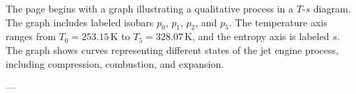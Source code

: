 The page begins with a graph illustrating a qualitative process in a \( T \)-\( s \) diagram. The graph includes labeled isobars \( p_0 \), \( p_1 \), \( p_2 \), and \( p_5 \). The temperature axis ranges from \( T_0 = 253.15 \, \text{K} \) to \( T_5 = 328.07 \, \text{K} \), and the entropy axis is labeled \( s \). The graph shows curves representing different states of the jet engine process, including compression, combustion, and expansion.

---
